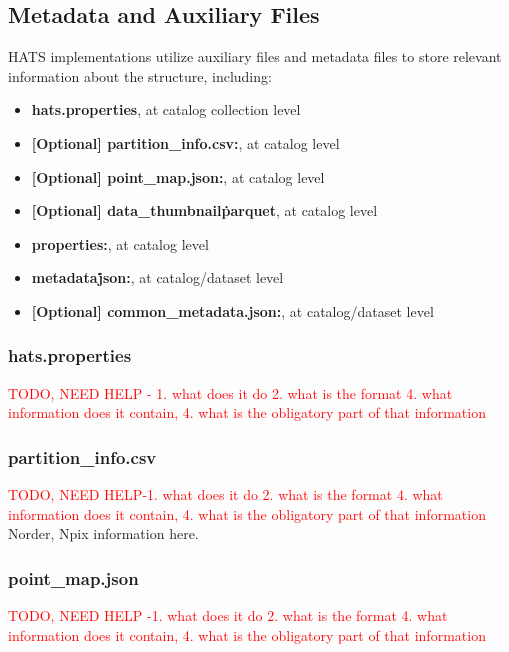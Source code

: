 \documentclass[11pt,a4paper]{ivoa}
\begin{document}
    \subsection{Metadata and Auxiliary Files} \label{sec:meta}
    HATS implementations utilize auxiliary files and metadata files to store relevant information about the  structure, including:
    \begin{itemize}
    	\item \textbf{hats.properties}, at catalog collection level
         \item \textbf{[Optional] partition\_info.csv:}, at catalog level
        \item \textbf{[Optional] point\_map.json:}, at catalog level
        \item \textbf{[Optional] data\_thumbnail\.parquet}, at catalog level
        \item \textbf{properties:}, at catalog level
        \item \textbf{metadata\.json:}, at catalog/dataset level
        \item \textbf{[Optional] common\_metadata.json:}, at catalog/dataset level
    \end{itemize}
    
    \subsubsection{hats.properties} 
    \textcolor{red}{TODO, NEED HELP - 1. what does it do 2. what is the format 4. what information does it contain, 4. what is the obligatory part of that information} 
        \subsubsection{partition\_info.csv} 
   \textcolor{red}{TODO, NEED HELP-1. what does it do 2. what is the format 4. what information does it contain, 4. what is the obligatory part of that information}
	Norder, Npix  information here. 
    
        \subsubsection{point\_map.json} 
   \textcolor{red}{TODO, NEED HELP -1. what does it do 2. what is the format 4. what information does it contain, 4. what is the obligatory part of that information}
   
\end{document}
